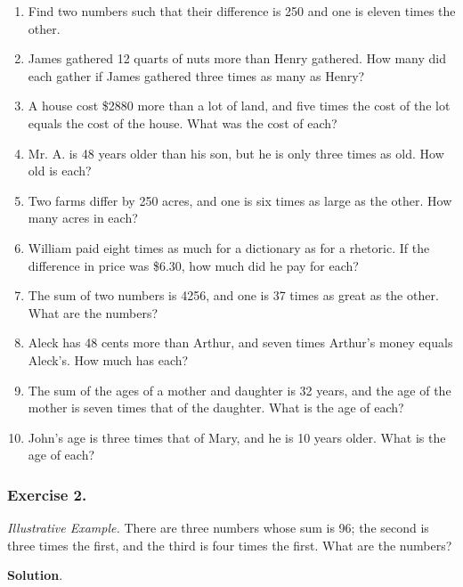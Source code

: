 \documentclass{book}
\begin{document}
\begin{enumerate}
\item  Find two numbers such that their difference is 250 and one
is eleven times the other.

\item  James gathered 12 quarts of nuts more than Henry gathered.
How many did each gather if James gathered three times as many as
Henry?

\item  A house cost \$2880 more than a lot of land, and five times
the cost of the lot equals the cost of the house. What was the
cost of each?

\item  Mr. A. is 48 years older than his son, but he is only three
times as old. How old is each?

\item Two farms differ by 250 acres, and one is six times as large
as the other. How many acres in each?

\item  William paid eight times as much for a dictionary as for a
rhetoric. If the difference in price was \$6.30, how much did he
pay for each?

\item  The sum of two numbers is 4256, and one is 37 times as
great as the other. What are the numbers?

\item  Aleck has 48 cents more than Arthur, and seven times
Arthur's money equals Aleck's. How much has each?

\item  The sum of the ages of a mother and daughter is 32 years,
and the age of the mother is seven times that of the daughter.
What is the age of each?

\item  John's age is three times that of Mary, and he is 10 years
older. What is the age of each?
\end{enumerate}

\subsubsection*{Exercise 2.}
\textit{ Illustrative Example.} There are three numbers whose sum
is 96; the second is three times the first, and the third is four
times the first. What are the numbers?

\begin{center}
\textbf{ Solution}.
\end{center}
\end{document}
